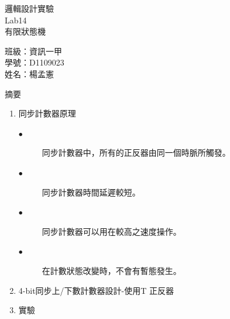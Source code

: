 \documentclass[12pt, a4paper]{article}
\begin{document}
\begin{center}
  {\Huge 邏輯設計實驗} \\[2.5cm]
  {\Huge Lab14} \\[1.5cm]
  {\Huge 有限狀態機} \\ [4.5cm]
  \hspace{.6in}
  \begin{minipage}[t]{.4\linewidth}
    {\Large 班級：資訊一甲}\\[0.5cm]
    {\Large 學號：D1109023}\\[0.5cm]
    {\Large 姓名：楊孟憲}
  \end{minipage}    
\end{center}

\newpage

\begin{description}
  \fontsize{22pt}{25pt}\selectfont 
    \item [一、]摘要 
      \begin{enumerate}
        \fontsize{20pt}{22pt}\selectfont
          \item 同步計數器原理 \\
            \begin{samepage}
              \fontsize{16pt}{20}\selectfont
              \begin{description}
                \item [$\bullet$] 同步計數器中，所有的正反器由同一個時脈所觸發。
                \item [$\bullet$] 同步計數器時間延遲較短。
                \item [$\bullet$] 同步計數器可以用在較高之速度操作。
                \item [$\bullet$] 在計數狀態改變時，不會有暫態發生。 \\[.2cm]
              \end{description}
            \end{samepage}

          \item 4-bit同步上/下數計數器設計-使用T 正反器 \\
            
          \item 實驗 
        \normalsize
      \end{enumerate}


\end{description}
\end{document}
